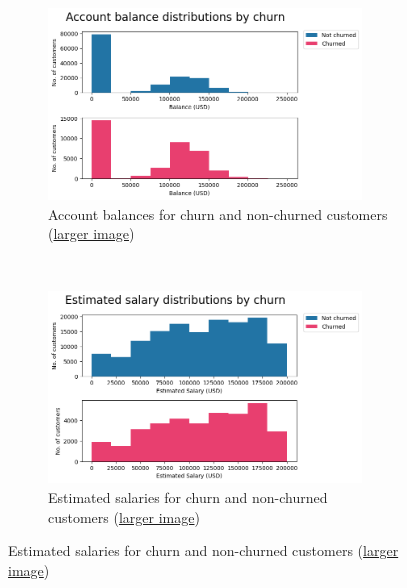 \documentclass[]{article}
\begin{document}
\begin{figure}[t!]
	\centering
	\begin{subfigure}[t]{0.55\textwidth}
		\centering
		\includegraphics[height=2in]{account_balance_by_churn}
		\caption{Account balances for churn and non-churned customers  (\href{https://github.com/ray33ee/Understanding-predicting-and-preventing-churn/blob/main/tex/account_balance_by_churn.png?raw=true}{larger image})}
	\end{subfigure}%
	~ 
	\begin{subfigure}[t]{0.5\textwidth}
		\centering
		\includegraphics[height=2in]{estimated_salary_by_churn}
		\caption{Estimated salaries for churn and non-churned customers (\href{https://github.com/ray33ee/Understanding-predicting-and-preventing-churn/blob/main/tex/estimated_salary_by_churn.png?raw=true}{larger image})}
	\end{subfigure}
	

\end{figure}
\end{document}
